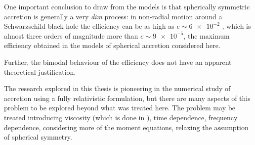 \documentclass[main.tex]{subfiles}
\begin{document}
One important conclusion to draw from the models is that spherically symmetric accretion is generally a very \emph{dim} process: in non-radial motion around a Schwarzschild black hole the efficiency can be as high as \(e \sim \num{6e-2}\) \cite[eq. 2.8.5]{Nobili:2000}, which is almost three orders of magnitude more than \(e\sim \num{9e-5}\), the maximum efficiency obtained in the models of spherical accretion considered here.

Further, the bimodal behaviour of the efficiency does not have an apparent theoretical justification.

The research explored in this thesis is pioneering in the numerical study of accretion using a fully relativistic formulation, but there are many aspects of this problem to be explored beyond what was treated here.
The problem may be treated introducing viscosity (which is done in \cite[]{TurollaNobili:1989}), time dependence, frequency dependence, considering more of the moment equations, relaxing the assumption of spherical symmetry.
\end{document}
